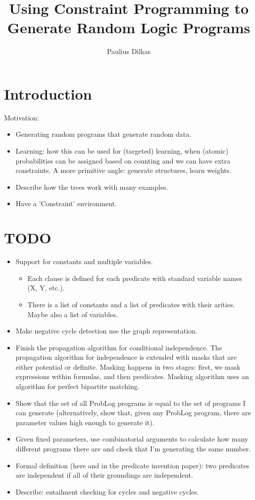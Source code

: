 \documentclass{article}
\author{Paulius Dilkas}
\title{Using Constraint Programming to Generate Random Logic Programs}
\theoremstyle{definition}
\begin{document}
\maketitle

\section{Introduction}

Motivation:
\begin{itemize}
\item Generating random programs that generate random data.
\item Learning: how this can be used for (targeted) learning, when (atomic)
  probabilities can be assigned based on counting and we can have extra
  constraints. A more primitive angle: generate structures, learn weights.
\item Describe how the trees work with many examples.
\item Have a 'Constraint' environment.
\end{itemize}

\section{TODO}

\begin{itemize}
\item Support for constants and multiple variables.
  \begin{itemize}
  \item Each clause is defined for each predicate with standard variable names
    (X, Y, etc.).
  \item There is a list of constants and a list of predicates with their
    arities. Maybe also a list of variables.
  \end{itemize}
\item Make negative cycle detection use the graph representation.
\item Finish the propagation algorithm for conditional independence. The
  propagation algorithm for independence is extended with masks that are either
  potential or definite. Masking happens in two stages: first, we mask
  expressions within formulas, and then predicates. Masking algorithm uses an
  algorithm for perfect bipartite matching.
\item Show that the set of all ProbLog programs is equal to the set of programs
  I can generate (alternatively, show that, given any ProbLog program, there are
  parameter values high enough to generate it).
\item Given fixed parameters, use combinatorial arguments to calculate how many
  different programs there are and check that I'm generating the same number.
\item Formal definition (here and in the predicate invention paper): two
  predicates are independent if all of their groundings are independent.
\item Describe: entailment checking for cycles and negative cycles.
\end{itemize}
\end{document}

